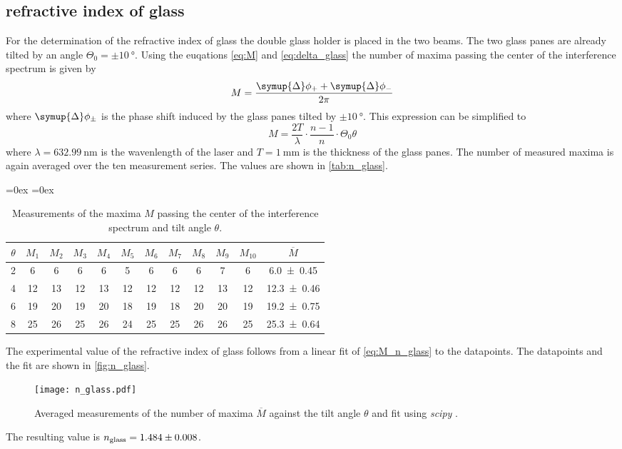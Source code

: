 \subsection{refractive index of glass}
For the determination of the refractive index of glass the double glass holder is placed in the two beams. The two glass panes are already tilted by an angle 
$\Theta_0 = \pm\qty{10}{\degree}$. 
Using the euqations \eqref{eq:M} and \eqref{eq:delta_glass} the number of maxima passing the center of the interference spectrum is given by
\begin{equation*}
  M = \frac{\symup{\Delta}\phi_+ + \symup{\Delta}\phi_-}{2\pi}
\end{equation*}
where $\symup{\Delta}\phi_\pm$ is the phase shift induced by the glass panes tilted by $\pm\qty{10}{\degree}$. 
This expression can be simplified to 
\begin{equation}
  \label{eq:M_n_glass}
  M = \frac{2T}{\lambda} \cdot \frac{n-1}{n} \cdot \Theta_0 \theta
\end{equation}
where $\lambda = \qty{632.99}{\nano\metre}$ is the wavenlength of the laser and $T = \qty{1}{\milli\metre}$ is the thickness of the glass panes.
The number of measured maxima is again averaged over the ten measurement series. The values are shown in \autoref{tab:n_glass}.
\begin{table}
  \centering
  \aboverulesep=0ex %
  \belowrulesep=0ex %
  \caption{Measurements of the maxima $M$ passing the center of the interference spectrum and tilt angle $\theta$.}
  \label{tab:n_glass}
  \begin{tabular}{c | c c c c c c c c c c | c}
    \toprule
    {$\theta$} & {$M_1$} & {$M_2$} & {$M_3$} & {$M_4$} & {$M_5$} & {$M_6$} & {$M_7$} & {$M_8$} & {$M_9$} & {$M_{10}$}  & {$\overline{M}$} \\
    \midrule
    \rule{0pt}{1.1EM}
    {2} &  6 &  6 &  6 &  6 &  5 &  6 &  6 &  6 &  7 &  6 & {\num{ 6.0 +- 0.45}} \\
    {4} & 12 & 13 & 12 & 13 & 12 & 12 & 12 & 12 & 13 & 12 & {\num{12.3 +- 0.46}} \\
    {6} & 19 & 20 & 19 & 20 & 18 & 19 & 18 & 20 & 20 & 19 & {\num{19.2 +- 0.75}} \\
    {8} & 25 & 26 & 25 & 26 & 24 & 25 & 25 & 26 & 26 & 25 & {\num{25.3 +- 0.64}} \\
    \bottomrule
  \end{tabular}
\end{table}
The experimental value of the refractive index of glass follows from a linear fit of \autoref{eq:M_n_glass} to the datapoints.
The datapoints and the fit are shown in \autoref{fig:n_glass}.
\begin{figure}
  \centering
  \texttt{[image: n\_glass.pdf]}
  \caption{Averaged measurements of the number of maxima $\overline{M}$ against the tilt angle $\theta$ and fit using \textit{scipy} \cite{scipy}.}
  \label{fig:n_glass}
\end{figure}
The resulting value is $n_\text{glass} = \num{1.484 +- 0.008}$.


